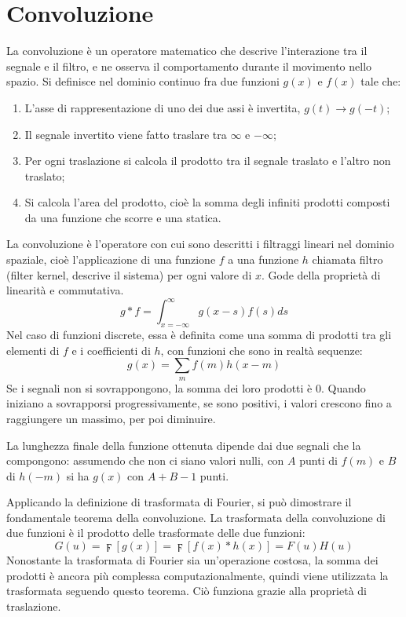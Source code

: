\section{Convoluzione}
La convoluzione è un operatore matematico che descrive l'interazione tra il segnale e il filtro, e ne osserva il comportamento durante il movimento nello spazio. Si definisce nel dominio continuo fra due funzioni $g(x)$ e $f(x)$ tale che:
\begin{enumerate}
	\item L'asse di rappresentazione di uno dei due assi è invertita, $g(t) \rightarrow g(-t)$;
	\item Il segnale invertito viene fatto traslare tra $\infty$ e $-\infty$;
	\item Per ogni traslazione si calcola il prodotto tra il segnale traslato e l'altro non traslato;
	\item Si calcola l'area del prodotto, cioè la somma degli infiniti prodotti composti da una funzione che scorre e una statica.
\end{enumerate}
La convoluzione è l'operatore con cui sono descritti i filtraggi lineari nel dominio spaziale, cioè l'applicazione di una funzione $f$ a una funzione $h$ chiamata filtro (filter kernel, descrive il sistema) per ogni valore di $x$. Gode della proprietà di linearità e commutativa.
$$g * f = \int_{x=-\infty}^{\infty}g(x - s)f(s) ds$$
Nel caso di funzioni discrete, essa è definita come una somma di prodotti tra gli elementi di $f$ e i coefficienti di $h$, con funzioni che sono in realtà sequenze:
$$g(x) = \sum_{m}f(m)h(x - m)$$
Se i segnali non si sovrappongono, la somma dei loro prodotti è 0. Quando iniziano a sovrapporsi progressivamente, se sono positivi, i valori crescono fino a raggiungere un massimo, per poi diminuire.


La lunghezza finale della funzione ottenuta dipende dai due segnali che la compongono: assumendo che non ci siano valori nulli, con $A$ punti di $f(m)$ e $B$ di $h(-m)$ si ha $g(x)$ con $A + B - 1$ punti.

Applicando la definizione di trasformata di Fourier, si può dimostrare il fondamentale teorema della convoluzione. La trasformata della convoluzione di due funzioni è il prodotto delle trasformate delle due funzioni: 
$$G(u) = \digamma[g(x)] = \digamma[f(x) * h(x)] = F(u)H(u)$$
Nonostante la trasformata di Fourier sia un'operazione costosa, la somma dei prodotti è ancora più complessa computazionalmente, quindi viene utilizzata la trasformata seguendo questo teorema. Ciò funziona grazie alla proprietà di traslazione. 

